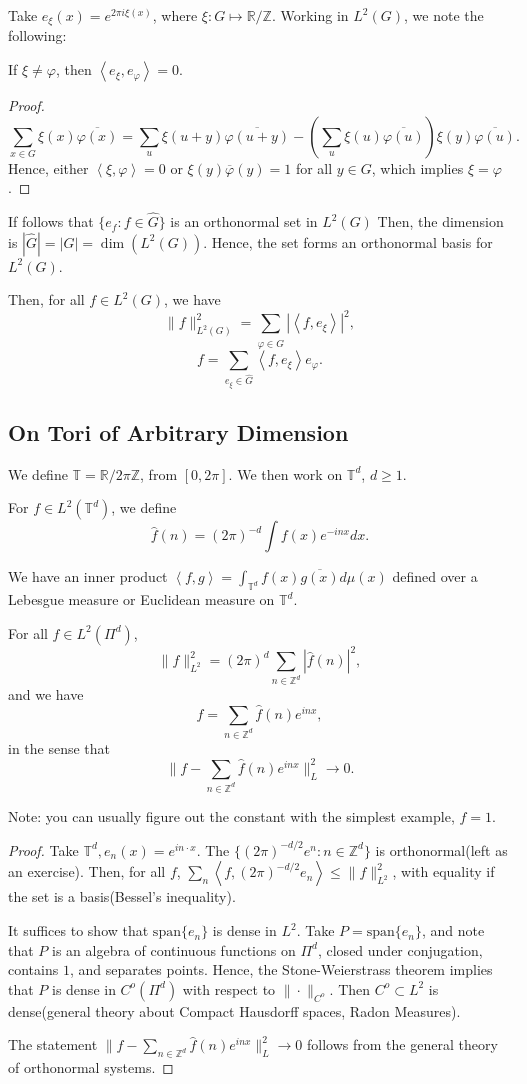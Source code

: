 \documentclass[11pt]{scrartcl}
\newcommand{\Z}{\mathbb{Z}}
\newcommand{\R}{\mathbb{R}}
\newcommand{\T}{\mathbb T}
\let \phi \varphi
\begin{document}
Take $e_\xi(x) = e^{2\pi i \xi(x)}$, where $\xi: G \mapsto \R/\Z$.  Working in $L^2(G)$, we note the following:

\begin{fact} If $\xi \ne \varphi$, then $\left<e_\xi, e_\varphi \right> = 0$.
\end{fact}
\begin{proof}
$$\sum_{x \in G} \xi(x) \overline{\varphi(x)} = \sum_{u} \xi(u+y)\overline{\varphi(u+y)} - \left (\sum_u \xi(u)\overline{\varphi(u)}\right ) \xi(y) \overline{\varphi(u)}.$$
Hence, either $\left < \xi, \phi\right > = 0$ or $\xi(y)\overline{\phi}(y) = 1$ for all $y \in G$, which implies $\xi = \phi$.
\end{proof}
If follows that $\{e_f : f \in \hat{G}\}$ is an orthonormal set in $L^2(G)$ Then, the dimension is $|\hat{G}| = |G| = \dim(L^2(G))$.  Hence, the set forms an orthonormal basis for $L^2(G)$.

Then, for all $f \in L^2(G)$,  we have $$\|f\|_{L^2(G)}^2 = \sum_{\phi \in \hat{G}} |\left <f, e_\xi\right >|^2,$$
$$f = \sum_{e_{\xi} \in \hat{G}} \left <f , e_{\xi}\right >e_\phi.$$

\subsection{On Tori of Arbitrary Dimension}
We define $\T = \R/2\pi\Z$, from $[0, 2\pi]$.  We then work on $\T^d$, $d \ge 1$.  

For $f \in L^2(\T^d)$, we define $$\hat{f}(n) = (2\pi)^{-d}\int f(x)e^{-inx}dx.$$

We have an inner product $\left <f, g\right > = \int_{\T^d} f(x) \overline{g(x)}d\mu(x)$ defined over a Lebesgue measure or Euclidean measure on $\T^d$. 

\begin{thm} For all $f \in L^2(\Pi^d)$,
$$\|f\|_{L^2}^2 = (2 \pi)^d \sum_{n \in \Z^d}|\hat{f}(n)|^2,$$
and we have 
$$f = \sum_{n \in \Z^d} \hat{f}(n)e^{inx},$$ in the sense that 
$$\|f - \sum_{n \in \Z^d} \hat{f}(n)e^{inx}\|_L^2 \rightarrow 0.$$ 
\end{thm}
Note: you can usually figure out the constant with the simplest example, $f = 1$.  
\begin{proof}
Take $\T^d, e_n(x) = e^{in\cdot x}$.  The $\{(2\pi)^{-d/2}e^n:n \in \Z^d\}$ is orthonormal(left as an exercise).  Then, for all $f$, $\sum_{n} \left <f, (2\pi)^{-d/2} e_n\right > \le \|f\|_{L^2}^2$, with equality if the set is a basis(Bessel's inequality).  

It suffices to show that $\text{span}\{e_n\}$ is dense in $L^2$.  Take $P = \text{span}\{e_n\}$, and note that $P$ is an algebra of continuous functions on $\Pi^d$,  closed under conjugation, contains $1$, and separates points.  Hence, the Stone-Weierstrass theorem implies that $P$ is dense in $C^o(\Pi^d)$ with respect to $\|\cdot\|_{C^o}$.  Then $C^o \subset L^2$ is dense(general theory about Compact Hausdorff spaces, Radon Measures).  

The statement $\|f - \sum_{n \in \Z^d} \hat{f}(n)e^{inx}\|_L^2 \rightarrow 0$ follows from the general theory of orthonormal systems.
\end{proof}
\end{document}
